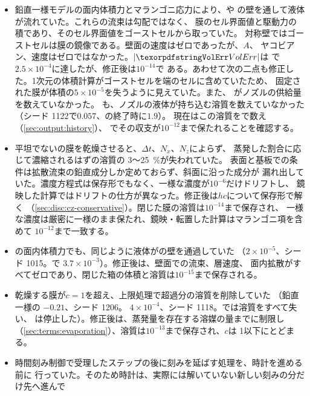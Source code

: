\begin{itemize}
  \item 鉛直一様モデルの面内体積力とマランゴニ応力により、や
    の壁を通して液体が流れていた。これらの流束は勾配ではなく、
    膜のセル界面値と駆動力の積であり、そのセル界面値をゴーストセルから取っていた。
    対称壁ではゴーストセルは膜の鏡像である。壁面の速度はゼロであったが、$A$、
    ヤコビアン、速度はゼロではなかった。$|\code{VolErr}|$は
    で$2.5\times10^{-4}$に達したが、修正後は$10^{-14}$で
    ある。あわせて次の二点も修正した。1次元の体積計算がゴーストセルを端のセルに含めていたため、
    固定された膜が体積の$5\times10^{-5}$を失うように見えていた。また、
    がノズルの供給量を数えていなかった。
    も、ノズルの液体が持ち込む溶質を数えていなかった
    （シード 1122で$0.057$、の終了時に$1.9$）。
    現在はこの溶質をで数え（\cref{sec:output:history}）、
    でその収支が$10^{-12}$まで保たれることを確認する。
  \item 平坦でないの膜を乾燥させると、$\Delta t$、$N_x$、$N_z$によらず、
    蒸発した割合に応じて濃縮されるはずの溶質の 3～\SI{25}{\percent}が失われていた。
    表面と基板での条件は拡散流束の鉛直成分しか定めておらず、斜面に沿った成分が
    漏れ出していた。濃度方程式は保存形でもなく、一様な濃度が$10^{-6}$だけドリフトし、
    鏡映した計算ではドリフトの仕方が異なった。修正後は$hc$について保存形で解く
    （\cref{sec:disc:cz-conservative}）。閉じた膜の溶質は$10^{-14}$まで保存され、
    一様な濃度は厳密に一様のまま保たれ、鏡映・転置した計算はマランゴニ項を含めて
    $10^{-12}$まで一致する。
  \item {}の面内体積力でも、同じように液体がの壁を通過していた
    （$2\times10^{-5}$、シード 1015。で
    $3.7\times10^{-3}$）。修正後は、壁面での流束、層速度、
    面内拡散がすべてゼロであり、閉じた箱の体積と溶質は$10^{-15}$まで保存される。
  \item 乾燥する膜が$c = 1$を超え、上限処理で超過分の溶質を削除していた
    （鉛直一様の $-0.21$、シード 1206。
    $4\times10^{-4}$、シード 1118。では溶質をすべて失い、
    は停止した）。修正後は、蒸発量を存在する溶媒の量までに制限し
    （\cref{sec:terms:evaporation}）、溶質は$10^{-13}$まで保存され、$c$は
    1以下にとどまる。
  \item 時間刻み制御で受理したステップの後に刻みを延ばす処理を、時計を進める前に
    行っていた。そのため時計は、実際には解いていない新しい刻みの分だけ先へ進んで

\end{itemize}
